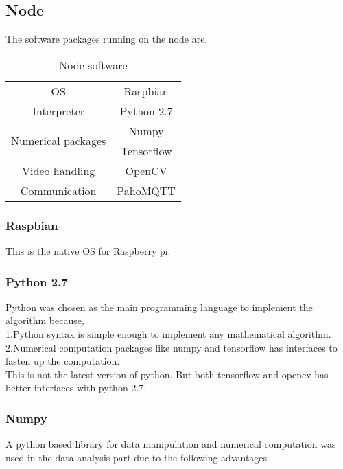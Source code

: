 \documentclass{report}
\begin{document}
\subsection{Node}
The software packages running on the node are,\\
\begin{table}[H]
    \centering
    \begin{tabular}{|c|c|}
        \hline
         OS &  Raspbian\\
         Interpreter & Python 2.7\\
         \multirow{2}{*}{Numerical packages}&Numpy\\
         &Tensorflow\\
         Video handling &   OpenCV\\
         Communication &    PahoMQTT\\
         \hline
    \end{tabular}
    \caption{Node software}
    \label{tab:my_label}
\end{table}

\subsubsection{Raspbian}
This is the native OS for Raspberry pi. 

\subsubsection{Python 2.7}
Python was chosen as the main programming language to implement the algorithm because,\\
\quad 1.Python syntax is simple enough to implement any mathematical algorithm.
\quad 2.Numerical computation packages like numpy and tensorflow has interfaces to fasten up the computation.\\

This is not the latest version of python. But both tensorflow and opencv has better interfaces with python 2.7.

\subsubsection{Numpy}

A python based library for data manipulation and numerical computation was used in the data analysis part due to the following advantages.
\end{document}
